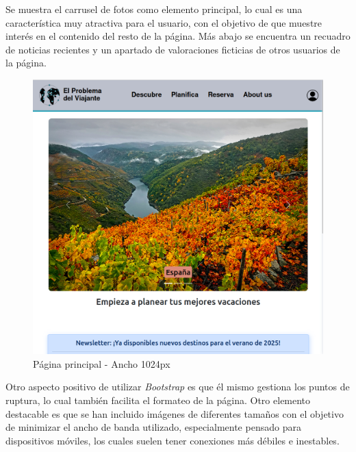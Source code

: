 \documentclass[11pt, a4paper]{book}
\begin{document}
	Se muestra el carrusel de fotos como elemento principal, lo cual es una característica muy atractiva para el usuario, con el objetivo de que muestre interés en el contenido del resto de la página. Más abajo se encuentra un recuadro de noticias recientes y un apartado de valoraciones ficticias de otros usuarios de la página.

	\begin{figure} [H]
		\centering
		\includegraphics[height=0.4\textheight]{CSS/1-3 1024.png}
		\caption{Página principal - Ancho 1024px}
	\end{figure}
	
	Otro aspecto positivo de utilizar \textit{Bootstrap} es que él mismo gestiona los puntos de ruptura, lo cual también facilita el formateo de la página. Otro elemento destacable es que se han incluido imágenes de diferentes tamaños con el objetivo de minimizar el ancho de banda utilizado, especialmente pensado para dispositivos móviles, los cuales suelen tener conexiones más débiles e inestables.
\end{document}

